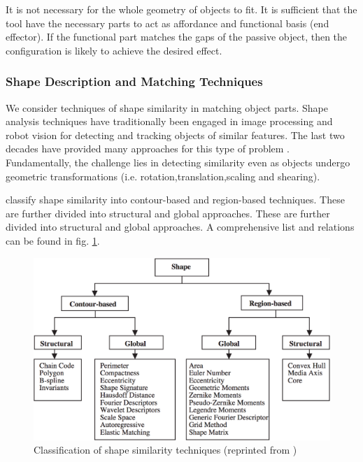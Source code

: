 \documentclass[
    floatsintext
]{article}
\begin{document}
It is not necessary for the whole geometry of objects to fit. 
It is sufficient that the tool have the necessary parts to act as affordance and functional basis (end effector\cite{zhu2015}).
If the functional part matches the gaps of the passive object, then the configuration is likely to achieve the desired effect. 

\subsubsection{Shape Description and Matching Techniques}
We consider techniques of shape similarity in matching object parts.
Shape analysis techniques have traditionally been engaged in image processing and robot vision for detecting and tracking objects of similar features.
The last two decades have provided many approaches for this type of problem \cite{loncaric1998,zhang2004,veltkamp2001,robert2012}.
Fundamentally, the challenge lies in detecting similarity even as objects undergo geometric transformations (i.e. rotation,translation,scaling and shearing).     

\cite{zhang2004} classify shape similarity into contour-based and region-based techniques. These are further divided into structural and global approaches.
These are further divided into structural and global approaches.
A comprehensive list and relations can be found in fig. \ref{fig:shape_similarity}. 

\begin{figure}[h]
  \centering
  \includegraphics[width=1\textwidth]{./figures/similarity_techniques.png}
  \caption{Classification of shape similarity techniques (reprinted from \cite{zhang2004})}
  \label{fig:shape_similarity}
\end{figure}  
\end{document}
